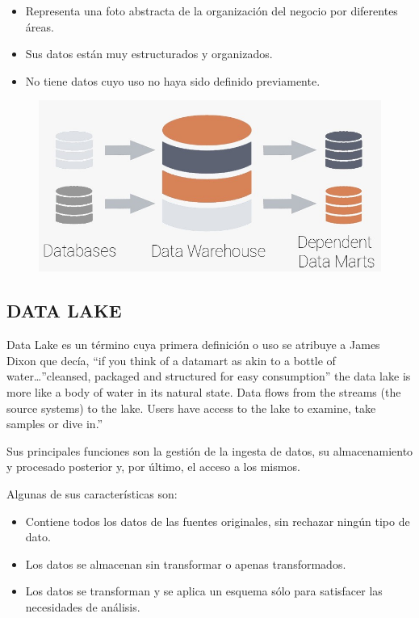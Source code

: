 \documentclass[preprint,12pt]{elsarticle}
\begin{document}
\begin{itemize}

\item Representa una foto abstracta de la organización del negocio por diferentes áreas.
\item Sus datos están muy estructurados y organizados.
\item No tiene datos cuyo uso no haya sido definido previamente.

\end{itemize}

\begin{figure}[htb]
				\begin{center}
					\includegraphics[width=15cm]{./IMAGENES/fiorella1}
				\end{center}
			\end{figure}

\subsection{DATA LAKE}

Data Lake es un término cuya primera definición o uso se atribuye a James Dixon que decía, “if you think of a datamart as akin to a bottle of water…”cleansed, packaged and structured for easy consumption” the data lake is more like a body of water in its natural state. Data flows from the streams (the source systems) to the lake. Users have access to the lake to examine, take samples or dive in.”

Sus principales funciones son  la gestión de la ingesta de datos, su almacenamiento y procesado posterior y, por último, el acceso a los mismos.

Algunas de sus características son:

\begin{itemize}
	
\item Contiene todos los datos de las fuentes originales, sin rechazar ningún tipo de dato.
\item Los datos se almacenan sin transformar o apenas transformados.
\item Los datos se transforman y se aplica un esquema sólo para satisfacer las necesidades de análisis.

\end{itemize}
\end{document}
